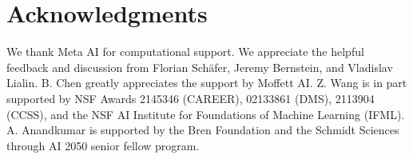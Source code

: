 \section*{Acknowledgments}

We thank Meta AI for computational
support. 
We appreciate the helpful feedback and discussion from Florian Sch{\"a}fer, Jeremy Bernstein, and Vladislav Lialin.
B. Chen greatly appreciates the support by Moffett AI.
Z. Wang is in part supported by NSF Awards 2145346 (CAREER), 02133861 (DMS), 2113904 (CCSS), and the NSF AI Institute for Foundations of Machine Learning (IFML).
A. Anandkumar is supported by the Bren Foundation and the Schmidt Sciences through AI 2050 senior fellow program.